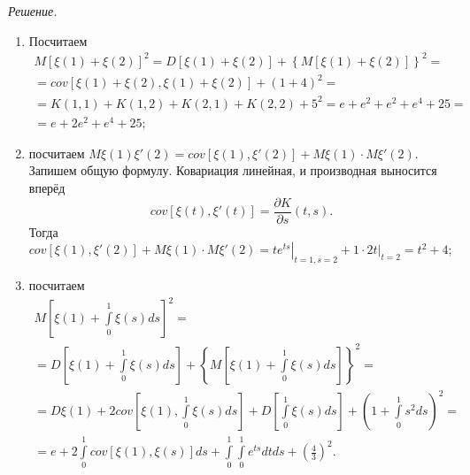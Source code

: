 \textit{Решение.}
\begin{enumerate}[label=\alph*)]
  \item Посчитаем
  \begin{gather*}
    M \left[ \xi \left( 1 \right) + \xi \left( 2 \right) \right]^2 =
    D \left[ \xi \left( 1 \right) + \xi \left( 2 \right) \right] +
    \left\{ M \left[ \xi \left( 1 \right) + \xi \left( 2 \right) \right] \right\}^2 = \\
    = cov \left[
      \xi \left( 1 \right) + \xi \left( 2 \right), \xi \left( 1 \right) + \xi \left( 2 \right)
    \right] + \left( 1 + 4 \right)^2 = \\
    = K \left( 1, 1 \right) + K \left( 1, 2 \right) + K \left( 2, 1 \right) +
    K \left( 2, 2 \right) + 5^2 =
    e + e^2 + e^2 + e^4 + 25 = \\
    = e + 2e^2 + e^4 + 25;
  \end{gather*}
  \item посчитаем
  $M \xi \left( 1 \right) \xi' \left( 2 \right) =
    cov \left[ \xi \left( 1 \right), \xi' \left( 2 \right) \right] +
    M \xi \left( 1 \right) \cdot M \xi' \left( 2 \right)$.
  Запишем общую формулу.
  Ковариация линейная, и производная выносится вперёд
  $$cov \left[ \xi \left( t \right), \xi' \left( t \right) \right] =
    \frac{ \partial K}{ \partial  s} \left( t, s \right).$$
  Тогда
  $cov \left[ \xi \left( 1 \right), \xi' \left( 2 \right) \right] +
    M \xi \left( 1 \right) \cdot M \xi' \left( 2 \right) =
    \left. te^{ts} \right|_{t = 1, s = 2} + \left. 1 \cdot 2t \right|_{t = 2} =
    t^2 + 4$;
  \item посчитаем
  \begin{gather*}
    M \left[ \xi \left( 1 \right) + \int \limits_0^1 \xi \left( s \right) ds \right]^2 = \\
    = D \left[ \xi \left( 1 \right) + \int \limits_0^1 \xi \left( s \right) ds \right] +
    \left\{
      M \left[ \xi \left( 1 \right) + \int \limits_0^1 \xi \left( s \right) ds \right]
    \right\}^2 = \\
    = D \xi \left( 1 \right) +
    2cov \left[ \xi \left( 1 \right), \int \limits_0^1 \xi \left( s \right) ds \right] +
    D \left[ \int \limits_0^1 \xi \left( s \right) ds \right] +
    \left( 1 + \int \limits_0^1 s^2 ds \right)^2 = \\
    = e + 2 \int \limits_0^1 cov \left[ \xi \left( 1 \right), \xi \left( s \right) \right] ds +
    \int \limits_0^1 \int \limits_0^1 e^{ts} dtds + \left( \frac{4}{3} \right)^2.
  \end{gather*}
\end{enumerate}

